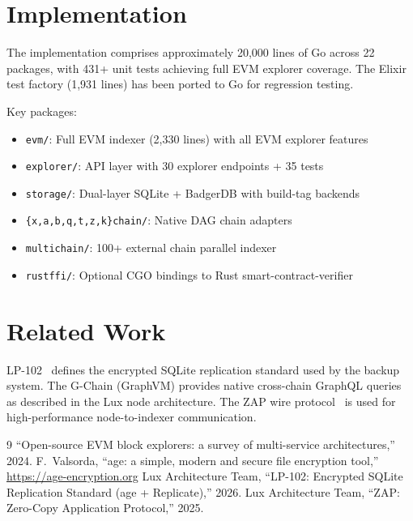 \documentclass[11pt,a4paper]{article}
\begin{document}
\section{Implementation}

The implementation comprises approximately 20,000 lines of Go across 22 packages, with
431+ unit tests achieving full EVM explorer coverage. The Elixir test factory
(1,931 lines) has been ported to Go for regression testing.

Key packages:
\begin{itemize}
  \item \texttt{evm/}: Full EVM indexer (2,330 lines) with all EVM explorer features
  \item \texttt{explorer/}: API layer with 30 explorer endpoints + 35 tests
  \item \texttt{storage/}: Dual-layer SQLite + BadgerDB with build-tag backends
  \item \texttt{\{x,a,b,q,t,z,k\}chain/}: Native DAG chain adapters
  \item \texttt{multichain/}: 100+ external chain parallel indexer
  \item \texttt{rustffi/}: Optional CGO bindings to Rust smart-contract-verifier
\end{itemize}

\section{Related Work}

LP-102~\cite{lp102} defines the encrypted SQLite replication standard used by the backup
system. The G-Chain (GraphVM) provides native cross-chain GraphQL queries as described in
the Lux node architecture. The ZAP wire protocol~\cite{zap} is used for high-performance
node-to-indexer communication.

\begin{thebibliography}{9}
 ``Open-source EVM block explorers: a survey of multi-service architectures,'' 2024.
 F.~Valsorda, ``age: a simple, modern and secure file encryption tool,'' \url{https://age-encryption.org}
 Lux Architecture Team, ``LP-102: Encrypted SQLite Replication Standard (age + Replicate),'' 2026.
 Lux Architecture Team, ``ZAP: Zero-Copy Application Protocol,'' 2025.
\end{thebibliography}
\end{document}
